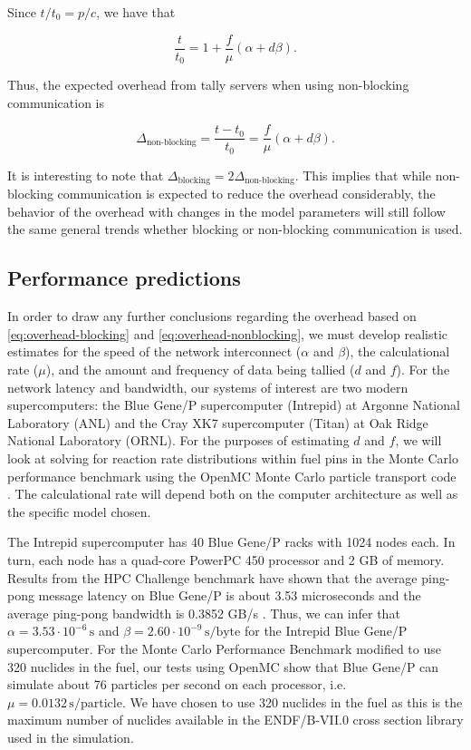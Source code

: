 \documentclass[3p,fleqn]{elsarticle}
\newcommand{\unit}[1]{\ensuremath{\, \mathrm{#1}}}
\begin{document}
\noindent Since $t/t_0 = p/c$, we have that

\begin{equation}
  \label{eq:model-nonblocking}
  \frac{t}{t_0} = 1 + \frac{f}{\mu} \left ( \alpha + d\beta
    \right ).
\end{equation}

\noindent Thus, the expected overhead from tally servers when using non-blocking
communication is

\begin{equation}
  \label{eq:overhead-nonblocking}
  \Delta_{\text{non-blocking}} = \frac{t - t_0}{t_0} = \frac{f}{\mu} \left (
  \alpha + d\beta \right ).
\end{equation}

\noindent It is interesting to note that $\Delta_{\text{blocking}} =
2\Delta_{\text{non-blocking}}$. This implies that while non-blocking
communication is expected to reduce the overhead considerably, the behavior of
the overhead with changes in the model parameters will still follow the same
general trends whether blocking or non-blocking communication is used.

\subsection{Performance predictions}

In order to draw any further conclusions regarding the overhead based on
\eqref{eq:overhead-blocking} and \eqref{eq:overhead-nonblocking}, we must
develop realistic estimates for the speed of the network interconnect ($\alpha$
and $\beta$), the calculational rate ($\mu$), and the amount and frequency of
data being tallied ($d$ and $f$). For the network latency and bandwidth, our
systems of interest are two modern supercomputers: the Blue Gene/P supercomputer
(Intrepid) at Argonne National Laboratory (ANL) and the Cray XK7 supercomputer
(Titan) at Oak Ridge National Laboratory (ORNL). For the purposes of estimating
$d$ and $f$, we will look at solving for reaction rate distributions within fuel
pins in the Monte Carlo performance benchmark \cite{mc11-hoogenboom} using the
OpenMC Monte Carlo particle transport code \cite{ane-romano-2013}. The
calculational rate will depend both on the computer architecture as well as the
specific model chosen.

The Intrepid supercomputer has 40 Blue Gene/P racks with 1024 nodes each. In
turn, each node has a quad-core PowerPC 450 processor and 2 GB of
memory. Results from the HPC Challenge benchmark have shown that the average
ping-pong message latency on Blue Gene/P is about 3.53 microseconds and the
average ping-pong bandwidth is 0.3852 GB/s \cite{bluegene}. Thus, we can infer
that $\alpha = 3.53 \cdot 10^{-6} \unit{s}$ and $\beta = 2.60 \cdot 10^{-9}
\unit{s/byte}$ for the Intrepid Blue Gene/P supercomputer. For the Monte Carlo
Performance Benchmark modified to use 320 nuclides in the fuel, our tests using
OpenMC show that Blue Gene/P can simulate about 76 particles per second on each
processor, i.e. $\mu = 0.0132 \unit{s/particle}$. We have chosen to use 320
nuclides in the fuel as this is the maximum number of nuclides available in the
ENDF/B-VII.0 cross section library used in the simulation.
\end{document}
